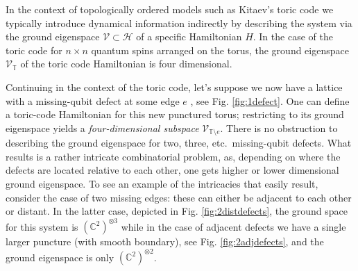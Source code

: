 \documentclass[aps,prb,twocolumn,superscriptaddress,noshowkeys]{revtex4-2}  %
\theoremstyle{plain}%
\theoremstyle{definition}
\theoremstyle{remark}
\begin{document}
In the context of topologically ordered models such as Kitaev's toric code \cite{Kit03} we typically introduce dynamical information indirectly by describing the system via the ground eigenspace $\mathcal{V}\subset \mathcal{H}$ of a specific Hamiltonian $H$. In the case of the toric code for $n\times n$ quantum spins arranged on the torus, the ground eigenspace $\mathcal{V}_{\mathbb{T}}$ of the toric code Hamiltonian is four dimensional.

Continuing in the context of the toric code, let's suppose we now have a lattice with a missing-qubit defect at some edge $e$ \cite{BLKW17}, see Fig. \ref{fig:1defect}. One can define a toric-code Hamiltonian for this new punctured torus; restricting to its ground eigenspace yields a \emph{four-dimensional subspace} $\mathcal{V}_{\mathbb{T}\setminus e}$. There is no obstruction to describing the ground eigenspace for two, three, etc.\ missing-qubit defects. What results is a rather intricate combinatorial problem, as, depending on where the defects are located relative to each other, one gets higher or lower dimensional ground eigenspace. To see an example of the intricacies that easily result, consider the case of two missing edges: these can either be adjacent to each other or distant. In the latter case, depicted in Fig. \ref{fig:2distdefects}, the ground space for this system is $(\mathbb{C}^2)^{\otimes 3}$ while in the case of adjacent defects we have a single larger puncture (with smooth boundary), see Fig. \ref{fig:2adjdefects}, and the ground eigenspace is only $(\mathbb{C}^2)^{\otimes 2}$.
\end{document}
